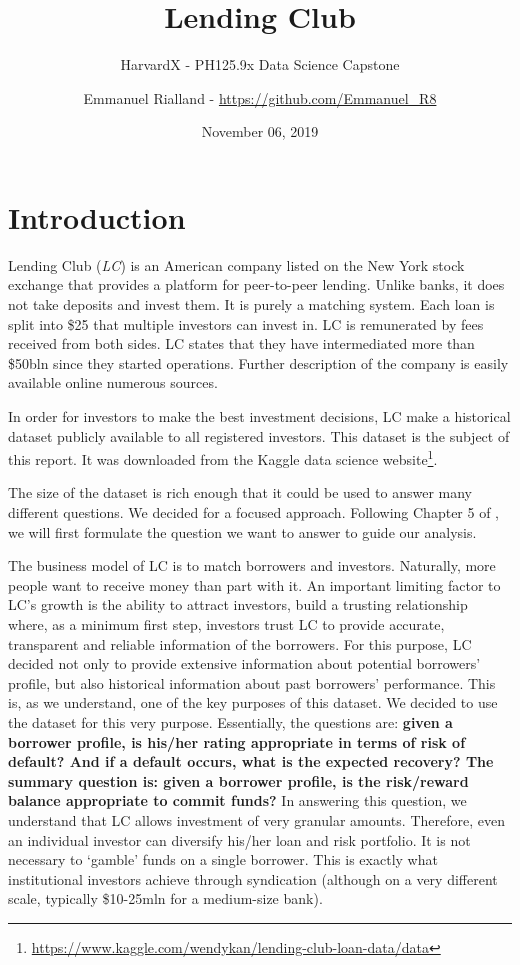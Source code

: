 \documentclass[11pt,]{report}
\title{Lending Club}
\subtitle{HarvardX - PH125.9x Data Science Capstone}
\author{Emmanuel Rialland - \url{https://github.com/Emmanuel_R8}}
\date{November 06, 2019}
\let\rmarkdownfootnote\footnote%
\def\footnote{\protect\rmarkdownfootnote}
\begin{document}
\maketitle

{
\hypersetup{linkcolor=black}
\setcounter{tocdepth}{2}
\tableofcontents
}
\listoftables
\listoffigures
\small

\normalsize

\hypertarget{introduction}{%
\chapter*{Introduction}\label{introduction}}

Lending Club (\emph{LC}) is an American company listed on the New York stock exchange that provides a platform for peer-to-peer lending. Unlike banks, it does not take deposits and invest them. It is purely a matching system. Each loan is split into \$25 that multiple investors can invest in. LC is remunerated by fees received from both sides. LC states that they have intermediated more than \$50bln since they started operations. Further description of the company is easily available online numerous sources.

In order for investors to make the best investment decisions, LC make a historical dataset publicly available to all registered investors. This dataset is the subject of this report. It was downloaded from the Kaggle data science website\footnote{\url{https://www.kaggle.com/wendykan/lending-club-loan-data/data}}.

The size of the dataset is rich enough that it could be used to answer many different questions. We decided for a focused approach. Following Chapter 5 of \citep{peng2012exploratory}, we will first formulate the question we want to answer to guide our analysis.

The business model of LC is to match borrowers and investors. Naturally, more people want to receive money than part with it. An important limiting factor to LC's growth is the ability to attract investors, build a trusting relationship where, as a minimum first step, investors trust LC to provide accurate, transparent and reliable information of the borrowers. For this purpose, LC decided not only to provide extensive information about potential borrowers' profile, but also historical information about past borrowers' performance. This is, as we understand, one of the key purposes of this dataset. We decided to use the dataset for this very purpose. Essentially, the questions are: \textbf{given a borrower profile, is his/her rating appropriate in terms of risk of default? And if a default occurs, what is the expected recovery? The summary question is: given a borrower profile, is the risk/reward balance appropriate to commit funds?} In answering this question, we understand that LC allows investment of very granular amounts. Therefore, even an individual investor can diversify his/her loan and risk portfolio. It is not necessary to `gamble' funds on a single borrower. This is exactly what institutional investors achieve through syndication (although on a very different scale, typically \$10-25mln for a medium-size bank).
\end{document}
